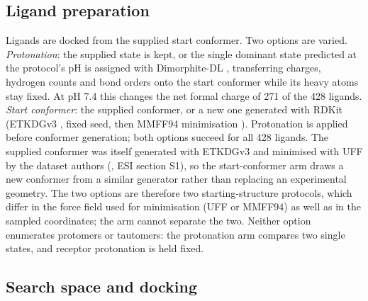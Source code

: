 \subsection{Ligand preparation}

Ligands are docked from the supplied start conformer. Two options are varied.
\emph{Protonation}: the supplied state is kept, or the single dominant state predicted at the
protocol's pH is assigned with Dimorphite-DL \citep{ropp2019dimorphite}, transferring charges, hydrogen counts
and bond orders onto the start conformer while its heavy atoms stay fixed. At pH 7.4 this
changes the net formal charge of 271 of the 428 ligands. \emph{Start conformer}: the supplied
conformer, or a new one generated with RDKit \citep{rdkit} (ETKDGv3 \citep{wang2020etkdgv3},
fixed seed, then MMFF94 minimisation \citep{halgren1996mmff94}). Protonation is applied before conformer generation; both options succeed for
all 428 ligands. The supplied conformer was itself generated with ETKDGv3 and minimised with
UFF \citep{rappe1992uff} by the dataset authors (\citealp{buttenschoen2024posebusters}, ESI section S1), so the
start-conformer arm draws a new conformer from a similar generator rather than replacing an
experimental geometry. The two options are therefore two starting-structure protocols, which
differ in the force field used for minimisation (UFF or MMFF94) as well as in the sampled
coordinates; the arm cannot separate the two. Neither option enumerates protomers or
tautomers: the protonation arm compares two single states, and receptor protonation is held
fixed.

\subsection{Search space and docking}

